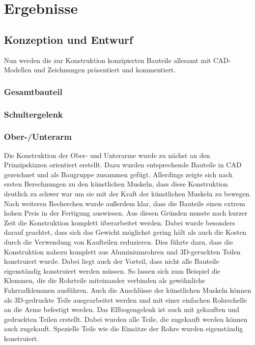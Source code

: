\chapter{Ergebnisse}
	\section{Konzeption und Entwurf}
		Nun werden die zur Konstruktion konzipierten Bauteile allesamt mit CAD-Modellen und Zeichnungen präsentiert und kommentiert.
		\subsection{Gesamtbauteil}
		\subsection{Schultergelenk}
		\subsection{Ober-/Unterarm}
		Die Konstruktion der Ober- und Unterarme wurde zu nächst an den Prinzipskizzen orientiert erstellt.
		Dazu wurden entsprechende Bauteile in CAD gezeichnet und als Baugruppe zusammen gefügt.
		Allerdings zeigte sich nach ersten Berechnungen zu den künstlichen Muskeln, dass diese Konstruktion deutlich zu schwer war um sie mit der Kraft der künstlichen Muskeln zu bewegen.
		Nach weiteren Recherchen wurde außerdem klar, dass die Bauteile einen extrem hohen Preis in der Fertigung auswiesen.
		Aus diesen Gründen musste nach kurzer Zeit die Konstruktion komplett überarbeitet werden.
		Dabei wurde besonders darauf geachtet, dass sich das Gewicht möglichst gering hält als auch die Kosten durch die Verwendung von Kaufteilen reduzieren.
		Dies führte dazu, dass die Konstruktion nahezu komplett aus Aluminiumrohren und 3D-geruckten Teilen konstruiert wurde.
		Dabei liegt auch der Vorteil, dass nicht alle Bauteile eigenständig konstruiert werden müssen.
		So lassen sich zum Beispiel die Klemmen, die die Rohrteile miteinander verbinden als gewöhnliche Fahrradklemmen ausführen.
		Auch die Anschlüsse der künstlichen Muskeln können als 3D-gedruckte Teile ausgearbeitet werden und mit einer einfachen Rohrschelle an die Arme befestigt werden.
		Das Ellbogengelenk ist auch mit gekauften und gedruckten Teilen erstellt.
		Dabei wurden alle Teile, die zugekauft werden können auch zugekauft.
		Spezielle Teile wie die Einsätze der Rohre wurden eigenständig konstruiert. 
